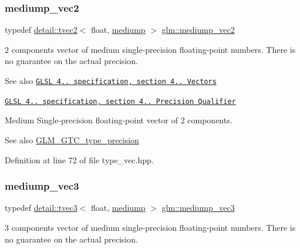 \subsubsection{\texorpdfstring{mediump\+\_\+vec2}{mediump\_vec2}}
{\footnotesize\ttfamily typedef \hyperlink{structglm_1_1detail_1_1tvec2}{detail\+::tvec2}$<$ float, \hyperlink{namespaceglm_a0f04f086094c747d227af4425893f545a6416f3ea0c9025fb21ed50c4d6620482}{mediump} $>$ \hyperlink{group__core__precision_ga1365858c541931eb8a7473fa85a1d1cf}{glm\+::mediump\+\_\+vec2}}

2 components vector of medium single-\/precision floating-\/point numbers. There is no guarantee on the actual precision.

\begin{DoxySeeAlso}{See also}
\href{http://www.opengl.org/registry/doc/GLSLangSpec.4.20.8.pdf}{\tt G\+L\+SL 4.. specification, section 4.. Vectors} 

\href{http://www.opengl.org/registry/doc/GLSLangSpec.4.20.8.pdf}{\tt G\+L\+SL 4.. specification, section 4.. Precision Qualifier}
\end{DoxySeeAlso}
Medium Single-\/precision floating-\/point vector of 2 components. \begin{DoxySeeAlso}{See also}
\hyperlink{group__gtc__type__precision}{G\+L\+M\+\_\+\+G\+T\+C\+\_\+type\+\_\+precision} 
\end{DoxySeeAlso}


Definition at line 72 of file type\+\_\+vec.\+hpp.

\mbox{\label{group__core__precision_ga10acc767a046b85205f52ce7f834626f}} 
\subsubsection{\texorpdfstring{mediump\+\_\+vec3}{mediump\_vec3}}
{\footnotesize\ttfamily typedef \hyperlink{structglm_1_1detail_1_1tvec3}{detail\+::tvec3}$<$ float, \hyperlink{namespaceglm_a0f04f086094c747d227af4425893f545a6416f3ea0c9025fb21ed50c4d6620482}{mediump} $>$ \hyperlink{group__core__precision_ga10acc767a046b85205f52ce7f834626f}{glm\+::mediump\+\_\+vec3}}

3 components vector of medium single-\/precision floating-\/point numbers. There is no guarantee on the actual precision.

